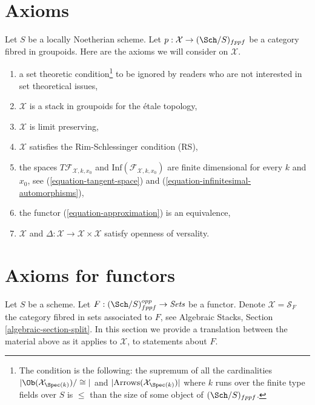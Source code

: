 \section{Axioms}
\label{section-axioms}

\noindent
Let $S$ be a locally Noetherian scheme. Let
$p : \mathcal{X} \to (\Sch/S)_{fppf}$ be a category fibred in groupoids.
Here are the axioms we will consider on $\mathcal{X}$.
\begin{enumerate}
\item[{[-1]}] a set theoretic condition\footnote{The condition is the
following: the supremum of all the cardinalities
$|\Ob(\mathcal{X}_{\Spec(k)})/\cong|$ and
$|\text{Arrows}(\mathcal{X}_{\Spec(k)})|$ where $k$ runs over the finite
type fields over $S$ is $\leq$ than the size of some
object of $(\Sch/S)_{fppf}$.} to be ignored by
readers who are not interested in set theoretical issues,
\item[{[0]}] $\mathcal{X}$ is a stack in groupoids for the \'etale topology,
\item[{[1]}] $\mathcal{X}$ is limit preserving,
\item[{[2]}] $\mathcal{X}$ satisfies the Rim-Schlessinger condition (RS),
\item[{[3]}] the spaces $T\mathcal{F}_{\mathcal{X}, k, x_0}$ and
$\text{Inf}(\mathcal{F}_{\mathcal{X}, k, x_0})$
are finite dimensional
for every $k$ and $x_0$, see
(\ref{equation-tangent-space}) and
(\ref{equation-infinitesimal-automorphisms}),
\item[{[4]}] the functor (\ref{equation-approximation}) is an equivalence,
\item[{[5]}] $\mathcal{X}$ and
$\Delta : \mathcal{X} \to \mathcal{X} \times \mathcal{X}$ satisfy
openness of versality.
\end{enumerate}










\section{Axioms for functors}
\label{section-axioms-functors}

\noindent
Let $S$ be a scheme. Let $F : (\Sch/S)_{fppf}^{opp} \to \textit{Sets}$ be a
functor. Denote $\mathcal{X} = \mathcal{S}_F$ the category fibred in sets
associated to $F$, see Algebraic Stacks, Section \ref{algebraic-section-split}.
In this section we provide a translation between the material above
as it applies to $\mathcal{X}$, to statements about $F$.


